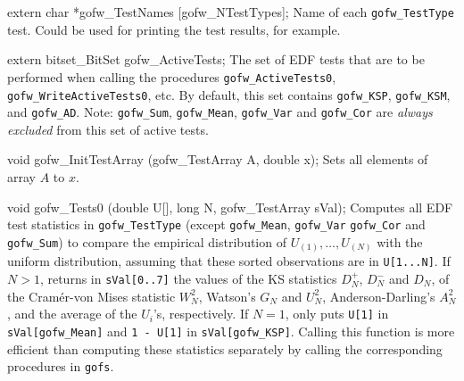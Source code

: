 extern char *gofw_TestNames [gofw_NTestTypes];
\endcode
 \tab  Name of each {\tt gofw\_TestType} test.
  Could be used for printing the test results, for example.
 \endtab
\code


extern bitset_BitSet gofw_ActiveTests;
\endcode
 \tab The set of EDF tests that are to be performed when calling
  the procedures {\tt gofw\_ActiveTests0}, {\tt gofw\_WriteActiveTests0}, etc.
  By default, this set contains {\tt gofw\_KSP}, {\tt gofw\_KSM},
  and {\tt gofw\_AD}.  %
  Note: {\tt gofw\_Sum}, {\tt gofw\_Mean}, {\tt gofw\_Var} and {\tt gofw\_Cor} are
  {\em always excluded\/} from this set of active tests.
 \endtab
\code


void gofw_InitTestArray (gofw_TestArray A, double x);
\endcode
 \tab Sets all elements of array $A$ to $x$.
 \endtab
\code


void gofw_Tests0 (double U[], long N, gofw_TestArray sVal);
\endcode
\tab  Computes all EDF test statistics in {\tt gofw\_TestType} (except
 {\tt gofw\_Mean}, {\tt gofw\_Var} {\tt gofw\_Cor} and  {\tt gofw\_Sum})
  to compare the empirical
  distribution of  $U_{(1)},\dots,U_{(N)}$ with the uniform distribution,
  assuming that these sorted observations are in {\tt U[1...N]}.
  If $N > 1$, returns in {\tt sVal[0..7]} the values of the KS
  statistics $D_N^+$, $D_N^-$ and $D_N$, of the Cram\'er-von Mises
  statistic $W_N^2$, Watson's $G_N$ and $U_N^2$, Anderson-Darling's
  $A_N^2$, and the average of the $U_i$'s, respectively.
  If $N = 1$, only puts {\tt U[1]} in {\tt sVal[gofw\_Mean]}
  and {\tt 1 - U[1]} in {\tt sVal[gofw\_KSP]}.
  Calling this function is more efficient than computing these statistics
  separately by calling the corresponding procedures in {\tt gofs}.
\endtab
\code


